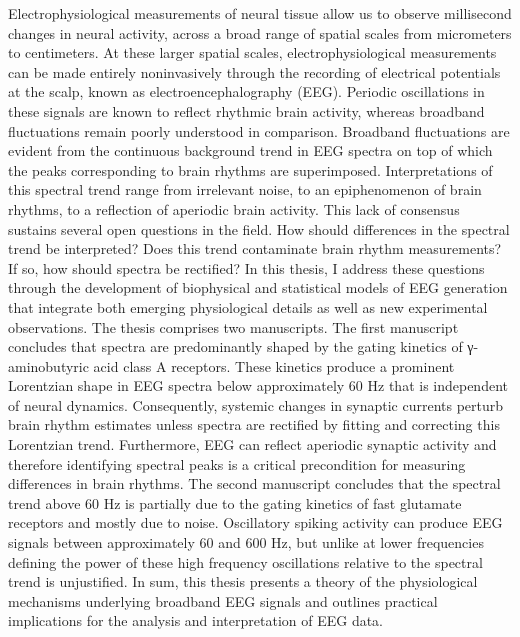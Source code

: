 \documentclass[11pt]{report}
\begin{document}
Electrophysiological measurements of neural tissue allow us to observe millisecond changes in neural activity, across a broad range of spatial scales from micrometers to centimeters. At these larger spatial scales, electrophysiological measurements can be made entirely noninvasively through the recording of electrical potentials at the scalp, known as electroencephalography (EEG). Periodic oscillations in these signals are known to reflect rhythmic brain activity, whereas broadband fluctuations remain poorly understood in comparison. Broadband fluctuations are evident from the continuous background trend in EEG spectra on top of which the peaks corresponding to brain rhythms are superimposed. Interpretations of this spectral trend range from irrelevant noise, to an epiphenomenon of brain rhythms, to a reflection of aperiodic brain activity. This lack of consensus sustains several open questions in the field. How should differences in the spectral trend be interpreted? Does this trend contaminate brain rhythm measurements? If so, how should spectra be rectified? In this thesis, I address these questions through the development of biophysical and statistical models of EEG generation that integrate both emerging physiological details as well as new experimental observations. The thesis comprises two manuscripts. The first manuscript concludes that spectra are predominantly shaped by the gating kinetics of γ-aminobutyric acid class A receptors. These kinetics produce a prominent Lorentzian shape in EEG spectra below approximately 60 Hz that is independent of neural dynamics. Consequently, systemic changes in synaptic currents perturb brain rhythm estimates unless spectra are rectified by fitting and correcting this Lorentzian trend. Furthermore, EEG can reflect aperiodic synaptic activity and therefore identifying spectral peaks is a critical precondition for measuring differences in brain rhythms. The second manuscript concludes that the spectral trend above 60 Hz is partially due to the gating kinetics of fast glutamate receptors and mostly due to noise. Oscillatory spiking activity can produce EEG signals between approximately 60 and 600 Hz, but unlike at lower frequencies defining the power of these high frequency oscillations relative to the spectral trend is unjustified. In sum, this thesis presents a theory of the physiological mechanisms underlying broadband EEG signals and outlines practical implications for the analysis and interpretation of EEG data.

\newpage
\end{document}
